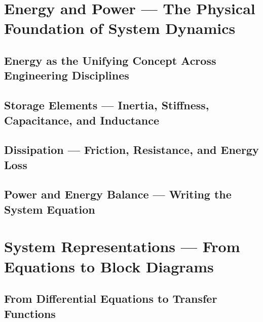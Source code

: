 \documentclass[11pt,letterpaper]{article}
\begin{document}


\section{Energy and Power --- The Physical Foundation of System Dynamics}
\label{sec:energy_power}

\subsection{Energy as the Unifying Concept Across Engineering Disciplines}
\label{sec:energy_unifying_concept}



\subsection{Storage Elements --- Inertia, Stiffness, Capacitance, and Inductance}
\label{sec:storage_elements}



\subsection{Dissipation --- Friction, Resistance, and Energy Loss}
\label{sec:dissipation}



\subsection{Power and Energy Balance --- Writing the System Equation}
\label{sec:power_energy_balance}



\section{System Representations --- From Equations to Block Diagrams}
\label{sec:system_representations}

\subsection{From Differential Equations to Transfer Functions}
\label{sec:diff_to_tf}
\end{document}
